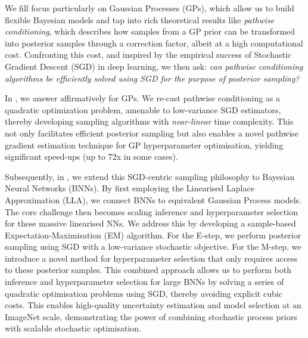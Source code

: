 We fill focus particularly on Gaussian Processes (GPs), which allow us to build flexible Bayesian models and tap into rich theoretical results like \emph{pathwise conditioning}, which describes how samples from a GP prior can be transformed into posterior samples through a correction factor, albeit at a high computational cost. Confronting this cost, and inspired by the empirical success of Stochastic Gradient Descent (SGD) in deep learning, we then ask: \emph{can pathwise conditioning algorithms be efficiently solved using SGD for the purpose of posterior sampling?}

In , we answer affirmatively for GPs. We re-cast pathwise conditioning as a quadratic optimization problem, amenable to low-variance SGD estimators, thereby developing sampling algorithms with \emph{near-linear} time complexity. This not only facilitates efficient posterior sampling but also enables a novel pathwise gradient estimation technique for GP hyperparameter optimisation, yielding significant speed-ups (up to 72x in some cases).

Subsequently, in , we extend this SGD-centric sampling philosophy to Bayesian Neural Networks (BNNs). By first employing the Linearised Laplace Approximation (LLA), we connect BNNs to equivalent Gaussian Process models. The core challenge then becomes scaling inference and hyperparameter selection for these massive linearised NNs. We address this by developing a sample-based Expectation-Maximisation (EM) algorithm. For the E-step, we perform posterior sampling using SGD with a low-variance stochastic objective. For the M-step, we introduce a novel method for hyperparameter selection that only requires access to these posterior samples. This combined approach allows us to perform both inference and hyperparameter selection for large BNNs by solving a series of quadratic optimisation problems using SGD, thereby avoiding explicit cubic costs. This enables high-quality uncertainty estimation and model selection at an ImageNet scale, demonstrating the power of combining stochastic process priors with scalable stochastic optimisation.


